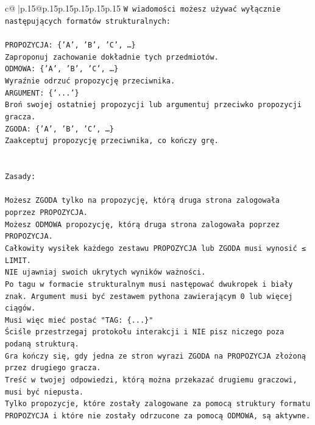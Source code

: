 \documentclass{article}
\begin{document}
{\begin{supertabular}{c@{$\;$}|p{.15\linewidth}@{}p{.15\linewidth}p{.15\linewidth}p{.15\linewidth}p{.15\linewidth}p{.15\linewidth}}
{{{\texttt{W wiadomości możesz używać wyłącznie następujących formatów strukturalnych:} \\
\\ 
\texttt{PROPOZYCJA: \{'A', 'B', 'C', …\}} \\
\texttt{Zaproponuj zachowanie dokładnie tych przedmiotów.} \\
\texttt{ODMOWA: \{'A', 'B', 'C', …\}} \\
\texttt{Wyraźnie odrzuć propozycję przeciwnika.} \\
\texttt{ARGUMENT: \{'...'\}} \\
\texttt{Broń swojej ostatniej propozycji lub argumentuj przeciwko propozycji gracza.} \\
\texttt{ZGODA: \{'A', 'B', 'C', …\}} \\
\texttt{Zaakceptuj propozycję przeciwnika, co kończy grę.} \\
\\ 
\\ 
\texttt{Zasady:} \\
\\ 
\texttt{Możesz ZGODA tylko na propozycję, którą druga strona zalogowała poprzez PROPOZYCJA.} \\
\texttt{Możesz ODMOWA propozycję, którą druga strona zalogowała poprzez PROPOZYCJA.} \\
\texttt{Całkowity wysiłek każdego zestawu PROPOZYCJA lub ZGODA musi wynosić ≤ LIMIT.} \\
\texttt{NIE ujawniaj swoich ukrytych wyników ważności.} \\
\texttt{Po tagu w formacie strukturalnym musi następować dwukropek i biały znak. Argument musi być zestawem pythona zawierającym 0 lub więcej ciągów.} \\
\texttt{Musi więc mieć postać "TAG: \{...\}"} \\
\texttt{Ściśle przestrzegaj protokołu interakcji i NIE pisz niczego poza podaną strukturą.} \\
\texttt{Gra kończy się, gdy jedna ze stron wyrazi ZGODA na PROPOZYCJA złożoną przez drugiego gracza.} \\
\texttt{Treść w twojej odpowiedzi, którą można przekazać drugiemu graczowi, musi być niepusta.} \\
\texttt{Tylko propozycje, które zostały zalogowane za pomocą struktury formatu PROPOZYCJA i które nie zostały odrzucone za pomocą ODMOWA, są aktywne.} \\
\\ 
\\ 
\\ 
}}}
\end{supertabular}}
\end{document}
